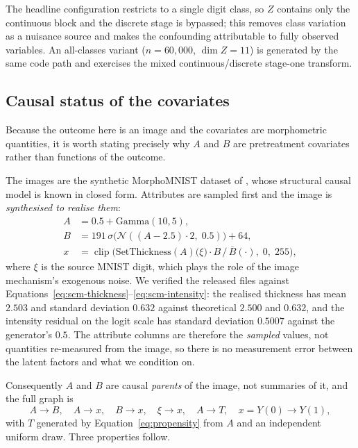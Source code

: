 The headline configuration restricts to a single digit class, so $Z$ contains only the
continuous block and the discrete stage is bypassed; this removes class variation as a
nuisance source and makes the confounding attributable to fully observed variables. An
all-classes variant ($n = 60{,}000$, $\dim Z = 11$) is generated by the same code path and
exercises the mixed continuous/discrete stage-one transform.

\subsection{Causal status of the covariates}
\label{sec:covariate-status}

Because the outcome here is an image and the covariates are morphometric quantities, it is
worth stating precisely why $A$ and $B$ are pretreatment covariates rather than functions of
the outcome.

The images are the synthetic MorphoMNIST dataset of \citet{pawlowski2020deepscm}, whose
structural causal model is known in closed form. Attributes are sampled first and the image is
\emph{synthesised to realise them}:
\begin{align}
    A &= 0.5 + \mathrm{Gamma}(10, 5), \label{eq:scm-thickness}\\
    B &= 191\,\sigma\!\big(\mathcal{N}((A - 2.5)\cdot 2,\; 0.5)\big) + 64,
        \label{eq:scm-intensity}\\
    x &= \operatorname{clip}\!\Big(\mathrm{SetThickness}(A)\big(\xi\big)
         \cdot B \,/\, \overline{B}(\cdot),\; 0,\; 255\Big),
        \label{eq:scm-image}
\end{align}
where $\xi$ is the source MNIST digit, which plays the role of the image mechanism's exogenous
noise. We verified the released files against
Equations~\eqref{eq:scm-thickness}--\eqref{eq:scm-intensity}: the realised thickness has mean
$2.503$ and standard deviation $0.632$ against theoretical $2.500$ and $0.632$, and the
intensity residual on the logit scale has standard deviation $0.5007$ against the generator's
$0.5$. The attribute columns are therefore the \emph{sampled} values, not quantities
re-measured from the image, so there is no measurement error between the latent factors and
what we condition on.

Consequently $A$ and $B$ are causal \emph{parents} of the image, not summaries of it, and the
full graph is
\begin{equation}
    A \to B, \quad A \to x, \quad B \to x, \quad \xi \to x, \quad
    A \to T, \quad x = Y(0) \to Y(1),
\end{equation}
with $T$ generated by Equation~\eqref{eq:propensity} from $A$ and an independent uniform draw.
Three properties follow.


